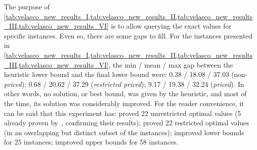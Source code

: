 \documentclass[ppgc,tese,english,formais,babel]{iiufrgs}
\begin{document}
The purpose of \cref{tab:velasco_new_results_I,tab:velasco_new_results_II,tab:velasco_new_results_III,tab:velasco_new_results_VI} is to allow querying the exact values for specific instances.
Even so, there are some gaps to fill.
For the instances presented in \cref{tab:velasco_new_results_I,tab:velasco_new_results_II,tab:velasco_new_results_III,tab:velasco_new_results_VI},
the min / mean / max gap between the heuristic lower bound and the final lower bound were: 0.38 / 18.08 / 37.03 (non-\emph{priced}); 0.68 / 20.62 / 37.29 (\emph{restricted priced}); 9.17 / 19.38 / 32.24 (\emph{priced}).
In other words, no solution, or best bound, was given by the heuristic, and most of the time, its solution was considerably improved.
For the reader convenience, it can be said that this experiment has:
proved 22 unrestricted optimal values (5 already proven by~\citet{velasco:2019}, confirming their results);
proved 22 restricted optimal values (in an overlapping but distinct subset of the instances);
improved lower bounds for 25 instances;
improved upper bounds for 58 instances.
\end{document}
